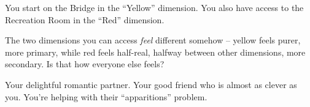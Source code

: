 \documentclass[char]{TMFHope}
\begin{document}
\begin{itemz}[Notes]
	\item You start on the Bridge in the ``Yellow'' dimension. You also have access to the Recreation Room in the ``Red'' dimension.
	\item The two dimensions you can access {\em feel} different somehow -- yellow feels purer, more primary, while red feels half-real, halfway between other dimensions, more secondary.  Is that how everyone else feels?
\end{itemz}

\begin{contacts}
	\contact{\cXO{}} Your delightful romantic partner. 
	\contact{\cMed{}} Your good friend who is almost as clever as you.
	\contact{\cCap{}}You're helping \cCap{\them} with their ``apparitions'' problem.
\end{contacts}
\end{document}
